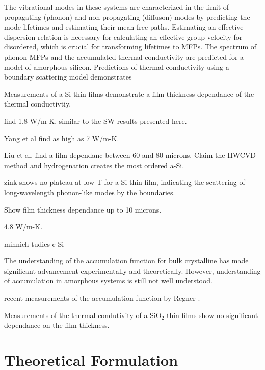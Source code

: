 \documentclass[aps,prb,twocolumn,superscriptaddress,footinbib,amsmath,amssymb,floatfix]{revtex4}
\begin{document}
The vibrational modes in these systems are
characterized in the limit of propagating (phonon) and 
non-propagating (diffuson) modes by predicting the mode lifetimes and 
estimating their mean free paths. Estimating an effective dispersion
relation is necessary for calculating an effective group velocity for 
disordered, which is crucial for transforming lifetimes to MFPs.
The spectrum of phonon MFPs and the accumulated thermal conductivity 
are predicted for a model of amorphous silicon. Predictions of thermal 
conductivity using a boundary scattering model demonstrates  

Measurements of a-Si thin films 
demonstrate a film-thickness dependance of the thermal conductivtiy.

\cite{wada_thermal_1996} find 1.8 W/m-K, similar to the SW results 
presented here.

Yang et al find as high as 7 W/m-K.\cite{yang_anomalously_2010}

Liu et al. find a film dependanc between 60 and 80 microns.
\cite{liu_high_2009} Claim the HWCVD method and hydrogenation 
creates the most ordered a-Si.

zink shows no plateau at low T for a-Si thin film, indicating 
the scattering of long-wavelength phonon-like modes 
by the boundaries.\cite{zink_thermal_2006}

Show film thickness dependance up to 10 microns.
\cite{kuo_thermal_1992}

4.8 W/m-K.\cite{hasselman_thermal_1989}

minnich tudies c-Si\cite{minnich_thermal_2011}

The understanding of the accumulation function for bulk 
crystalline has made significant advancement experimentally
\cite{}
and 
theoretically.\cite{yang_mean_2013} However, understanding 
of accumulation in amorphous systems is still not 
well understood.
\cite{feldman_thermal_1993,feldman_numerical_1999,he_thermal_2011}

recent measurements of the accumulation function by Regner .
\cite{regner_broadband_2013}

Measurements of the thermal condutivity of a-SiO$_2$ thin 
films show no significant dependance on the film thickness. 
\cite{lee_heat_1997,yamane_measurement_2002} 


\section{\label{S:Theory}Theoretical Formulation}
\end{document}
